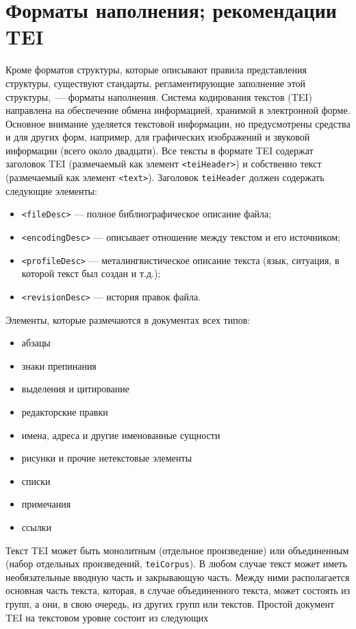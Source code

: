 \documentclass[12pt]{article}
\theoremstyle{definition}
\theoremstyle{remark}
\numberwithin{equation}{section}
\begin{document}
\section{Форматы наполнения; рекомендации TEI}
\label{sec:TEI}
Кроме форматов структуры, которые описывают правила представления структуры, существуют стандарты, регламентирующие заполнение этой структуры,~--- форматы наполнения.
Система кодирования текстов (TEI) направлена на обеспечение обмена информацией, хранимой
в электронной форме. Основное внимание уделяется текстовой информации, но предусмотрены средства и для других форм, например, для графических изображений и звуковой информации (всего около двадцати). Все тексты в формате TEI содержат заголовок TEI (размечаемый как элемент \texttt{<teiHeader>}) и собственно текст (размечаемый как элемент \texttt{<text>}). Заголовок \texttt{teiHeader} должен содержать следующие элементы:
\begin{itemize}
\item \texttt{<fileDesc>} --- полное библиографическое описание файла;
\item \texttt{<encodingDesc>} --- описывает отношение между текстом и его источником;
\item \texttt{<profileDesc>} --- металингвистическое описание текста (язык, ситуация, в которой текст был создан и т.д.);
\item \texttt{<revisionDesc>} --- история правок файла.
\end{itemize}
Элементы, которые размечаются в документах всех типов:
\begin{itemize}
\item абзацы
\item знаки препинания
\item выделения и цитирование
\item редакторские правки
\item имена, адреса и другие именованные сущности
\item рисунки и прочие нетекстовые элементы
\item списки
\item примечания
\item ссылки
\end{itemize}
Текст TEI может быть монолитным (отдельное произведение) или объединенным (набор
отдельных произведений, \texttt{teiCorpus}). В любом случае текст может иметь
необязательные вводную часть и закрывающую часть. Между ними располагается основная часть
текста, которая, в случае объединенного текста, может состоять из групп, а они, в свою очередь, из других групп или текстов. Простой документ TEI на текстовом уровне состоит из следующих
\end{document}
